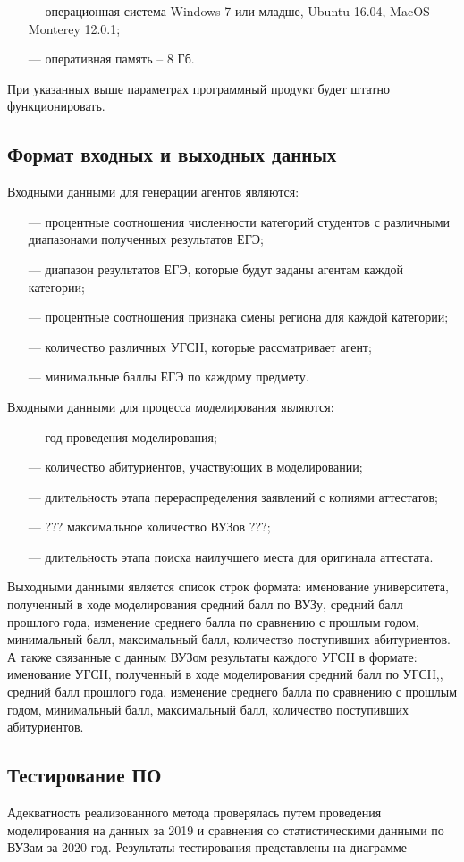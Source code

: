 \begin{itemize}[leftmargin=1.6\parindent]
	\item[---] операционная система Windows 7 или младше, Ubuntu 16.04, MacOS Monterey 12.0.1;
	\item[---] оперативная память – 8 Гб.
	
\end{itemize}

При указанных выше параметрах программный продукт будет штатно функционировать.

\subsection{Формат входных и выходных данных}

Входными данными для генерации агентов являются:

\begin{itemize}[leftmargin=1.6\parindent]
	\item[---] процентные соотношения численности категорий студентов с различными диапазонами полученных результатов ЕГЭ;
	\item[---] диапазон результатов ЕГЭ, которые будут заданы агентам каждой категории;
	\item[---] процентные соотношения признака смены региона для каждой категории;
	\item[---] количество различных УГСН, которые рассматривает агент;
	\item[---] минимальные баллы ЕГЭ по каждому предмету.
\end{itemize}

Входными данными для процесса моделирования являются:

\begin{itemize}[leftmargin=1.6\parindent]
	\item[---] год проведения моделирования;
	\item[---] количество абитуриентов, участвующих в моделировании;
	\item[---] длительность этапа перераспределения заявлений с копиями аттестатов;
	\item[---] ??? максимальное количество ВУЗов ???;
	\item[---] длительность этапа поиска наилучшего места для оригинала аттестата.
	
\end{itemize}

Выходными данными является список строк формата: именование университета, полученный в ходе моделирования средний балл по ВУЗу, средний балл прошлого года, изменение среднего балла по сравнению с прошлым годом, минимальный балл, максимальный балл, количество поступивших абитуриентов. А также связанные с данным ВУЗом результаты каждого УГСН в формате: именование УГСН, полученный в ходе моделирования средний балл по УГСН,, средний балл прошлого года, изменение среднего балла по сравнению с прошлым годом, минимальный балл, максимальный балл, количество поступивших абитуриентов.


\subsection{Тестирование ПО}

Адекватность реализованного метода проверялась путем проведения моделирования на данных за 2019 и сравнения со статистическими данными по ВУЗам за 2020 год. Результаты тестирования представлены на диаграмме


\pagebreak